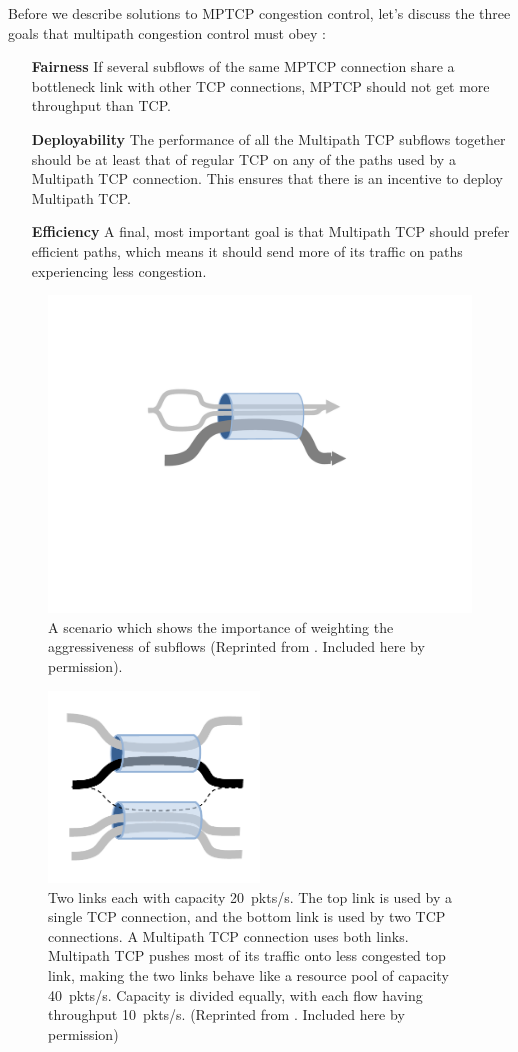 Before we describe solutions to MPTCP congestion control, let's discuss the three goals that
multipath congestion control must obey \cite{mptcp-cc}:
\begin{enumerate}
\item[\textbf{Fairness}] If several subflows of the same MPTCP connection
share a bottleneck link with other TCP connections, MPTCP should not
get more throughput than TCP. 
\item[\textbf{Deployability}] The performance of all the
Multipath TCP subflows together should be at least that of regular TCP
on any of the paths used by a Multipath TCP connection.  This ensures
that there is an incentive to deploy Multipath TCP. 
\item[\textbf{Efficiency}] A final, most important goal is that Multipath TCP should prefer efficient paths,
which means it should send more of its traffic on paths experiencing
less congestion.
\end{enumerate}

\begin{figure}[t]
\centering
\includegraphics*[width=0.45\columnwidth,bb=167 245 509 380]{figures/1bottleneck}
\caption{A scenario which shows the importance of weighting the
  aggressiveness of subflows (Reprinted from \cite{mptcp-cc}. Included
  here by permission).}
\label{fig:1bottleneck}
\end{figure}

\begin{figure}[t]
\centering
\includegraphics[width=0.5\textwidth]{figures/figure1}
\caption{Two links each with capacity 20~pkts/s. The top link is used by a single TCP connection,
and the bottom link is used by two TCP connections. A Multipath TCP connection uses
both links. Multipath TCP pushes most of its traffic onto less congested top link,
making the two links behave like a resource pool of capacity 40~pkts/s. Capacity is divided equally,
with each flow having throughput 10~pkts/s. (Reprinted from
\cite{mptcp-cc}. Included here by permission)}
\label{fig:mptcp1}
\end{figure}

